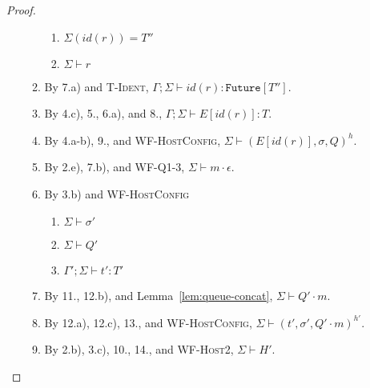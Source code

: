 \documentclass{article}
\theoremstyle{definition}
\begin{document}
\begin{proof}
\begin{itemize}
\begin{enumerate}
  \begin{enumerate}[label=(\alph*)]
  \item $\Sigma(id(r)) = T''$
  \item $\Sigma \vdash r$
  \end{enumerate}
\item By 7.a) and \textsc{T-Ident}, $\Gamma ; \Sigma \vdash id(r) : \texttt{Future}[T'']$.
\item By 4.c), 5., 6.a), and 8., $\Gamma ; \Sigma \vdash E[id(r)] : T$.
\item By 4.a-b), 9., and \textsc{WF-HostConfig}, $\Sigma \vdash (E[id(r)], \sigma, Q)^h$.
\item By 2.e), 7.b), and \textsc{WF-Q1-3}, $\Sigma \vdash m \cdot \epsilon$.
\item By 3.b) and \textsc{WF-HostConfig}
  \begin{enumerate}[label=(\alph*)]
  \item $\Sigma \vdash \sigma'$
  \item $\Sigma \vdash Q'$
  \item $\Gamma' ; \Sigma \vdash t' : T'$
  \end{enumerate}
\item By 11., 12.b), and Lemma~\ref{lem:queue-concat}, $\Sigma \vdash Q' \cdot m$.
\item By 12.a), 12.c), 13., and \textsc{WF-HostConfig}, $\Sigma \vdash (t', \sigma', Q' \cdot m)^{h'}$.
\item By 2.b), 3.c), 10., 14., and \textsc{WF-Host2}, $\Sigma \vdash H'$.
\end{enumerate}


\end{itemize}
\end{proof}
\end{document}
